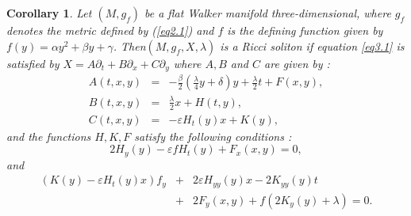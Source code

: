 \documentclass[reqno, 12pt]{amsart}
\numberwithin{equation}{section}
\newtheorem{corollary}[theorem]{Corollary}
\begin{document}
 
 \begin{corollary}
Let $(M, g_f)$ be a flat Walker manifold three-dimensional, where $g_f$ 
denotes the metric defined by (\ref{eq2.1}) and $f$ is the defining function 
given by $f(y)=\alpha y^{2}+\beta y+\gamma$. Then$(M, g_f, X, \lambda)$ 
is a Ricci soliton  if equation \eqref{eq3.1} is satisfied by 
$X = A\partial_t+ B\partial_x + C \partial_y $ where $A, B $ and $C$ are given by :
\begin{eqnarray}\label{eq3.8}
A(t,x, y) &=& - \frac{\beta}{2} \left( \frac{\lambda}{4}y+ \delta\right)y  
		+ \frac{\lambda }{2} t +F(x,y), \nonumber\\ 
B(t,x,y) &=&\frac{\lambda}{2}x+H(t,y),\nonumber  \\ 
C(t,x,y) &=& -\varepsilon H_{t}(y)x+K(y),
\end{eqnarray}
and the functions $H,K,F$ satisfy the following conditions :
\begin{equation*}
2H_y(y) - \varepsilon fH_t(y) + F_x(x,y)=0,
\end{equation*}
and
\begin{eqnarray*}
\left(K(y) - \varepsilon H_{t}(y)x\right)f_y &+& 2\varepsilon H_{yy}(y)x - 2K_{yy}(y)t \\
	&+& 2F_{y}(x,y) + f\left( 2K_{y}(y) + \lambda\right) =0. 
\end{eqnarray*}
\end{corollary}
\end{document}
